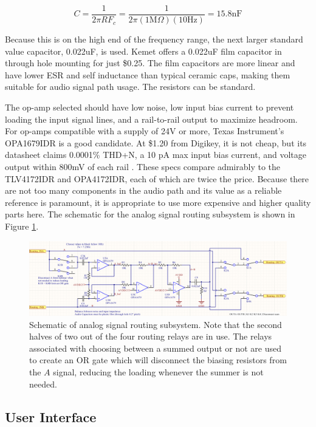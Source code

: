 \documentclass{article}
\begin{document}
	$$ C = \frac{1}{2\pi R F_c} = \frac{1}{2\pi (1 \text{M}\Omega) (10 \text{Hz})} = 15.8 \text{nF}$$

	Because this is on the high end of the frequency range, the next larger standard value capacitor, 0.022uF, is used.  Kemet offers a 0.022uF film capacitor in through hole mounting for just \$0.25.  The film capacitors are more linear and have lower ESR and self inductance than typical ceramic caps, making them suitable for audio signal path usage.  The resistors can be standard.

	The op-amp selected should have low noise, low input bias current to prevent loading the input signal lines, and a rail-to-rail output to maximize headroom.  For op-amps compatible with a supply of 24V or more, Texas Instrument's OPA1679IDR is a good candidate.  At \$1.20 from Digikey, it is not cheap, but its datasheet claims 0.0001\% THD+N, a 10 pA max input bias current, and voltage output within 800mV of each rail \cite{OPA1679IDRdatasheet}.  These specs compare admirably to the TLV4172IDR and OPA4172IDR, each of which are twice the price.  Because there are not too many components in the audio path and its value as a reliable reference is paramount, it is appropriate to use more expensive and higher quality parts here.  The schematic for the analog signal routing subsystem is shown in Figure \ref{fig:routingschem}.  

	\begin{figure}
		\centering
		\includegraphics[width = \textwidth]{PR4Images/RoutingSchem.PNG}
		\caption{Schematic of analog signal routing subsystem.  Note that the second halves of two out of the four routing relays are in use.  The relays associated with choosing between a summed output or not are used to create an OR gate which will disconnect the biasing resistors from the $A$ signal, reducing the loading whenever the summer is not needed.}
		\label{fig:routingschem}
	\end{figure}

	\color{black}

	\subsection{User Interface}
\end{document}
